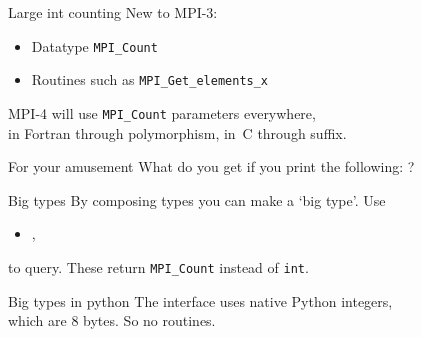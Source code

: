\begin{numberedframe}{Large int counting}
  New to MPI-3: 
  \begin{itemize}
  \item Datatype \lstinline{MPI_Count}
  \item Routines such as \lstinline{MPI_Get_elements_x}
  \end{itemize}

  MPI-4 will use \lstinline{MPI_Count} parameters everywhere,\\
  in Fortran through polymorphism, in~C through  suffix.
\end{numberedframe}

\begin{numberedframe}{For your amusement}
What do you get if you print the following:
?
\end{numberedframe}

\begin{numberedframe}{Big types}
  By composing types you can make a `big type'. Use
  \begin{itemize}
  \item {},
  \end{itemize}
  to query.
  These return \lstinline{MPI_Count} instead of \lstinline{int}.
\end{numberedframe}

\begin{numberedframe}{Big types in python}
  The  interface uses native Python integers,\\
  which are 8 bytes. So no  routines.
\end{numberedframe}

\endinput

\begin{numberedframe}{}
\begin{lstlisting}
\end{lstlisting}
\end{numberedframe}

